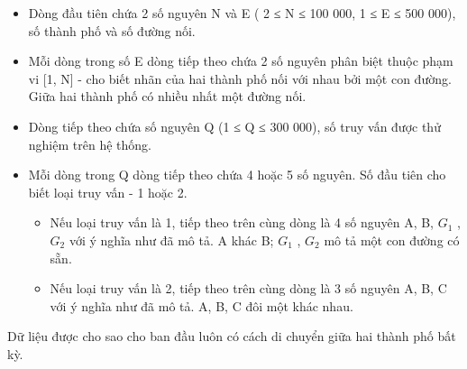 \begin{itemize}
	\item     Dòng đầu tiên chứa 2 số nguyên N và E ( 2 ≤ N ≤ 100 000, 1 ≤ E ≤ 500 000), số thành phố và số đường nối.   
	\item     Mỗi dòng trong số E dòng tiếp theo chứa 2 số nguyên phân biệt thuộc phạm vi [1, N] - cho biết nhãn của hai thành phố nối với nhau bởi một con đường. Giữa hai thành phố có nhiều nhất một đường nối.   
	\item     Dòng tiếp theo chứa số nguyên Q (1 ≤ Q ≤ 300 000), số truy vấn được thử nghiệm trên hệ thống.   
	\item     Mỗi dòng trong Q dòng tiếp theo chứa 4 hoặc 5 số nguyên. Số đầu tiên cho biết loại truy vấn - 1 hoặc 2.    
\begin{itemize}
	\item       Nếu loại truy vấn là 1, tiếp theo trên cùng dòng là 4 số nguyên A, B, $G_{1}$      , $G_{2}$      với ý nghĩa như đã mô tả. A khác B; $G_{1}$      , $G_{2}$      mô tả một con đường có   sẵn.     
	\item       Nếu loại truy vấn là 2, tiếp theo trên cùng dòng là 3 số nguyên A, B, C với ý nghĩa như đã mô tả. A, B, C đôi một khác nhau.     
\end{itemize}
\end{itemize}

   Dữ liệu được cho sao cho ban đầu luôn có cách di chuyển giữa hai thành phố bất kỳ.